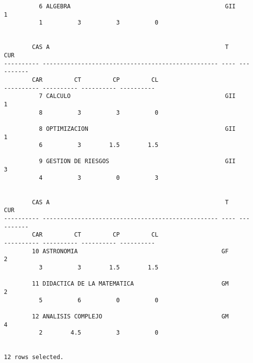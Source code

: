 \documentclass[11pt]{report}
\begin{document}
\begin{itemize}
\begin{verbatim}
          6 ALGEBRA                                            GII           1   
          1          3          3          0                                     
                                                                                

        CAS A                                                  T           CUR   
---------- -------------------------------------------------- ---- ----------   
        CAR         CT         CP         CL                                     
---------- ---------- ---------- ----------                                     
          7 CALCULO                                            GII           1   
          8          3          3          0                                     
                                                                                
          8 OPTIMIZACION                                       GII           1   
          6          3        1.5        1.5                                     
                                                                                
          9 GESTION DE RIESGOS                                 GII           3   
          4          3          0          3                                     
                                                                                

        CAS A                                                  T           CUR   
---------- -------------------------------------------------- ---- ----------   
        CAR         CT         CP         CL                                     
---------- ---------- ---------- ----------                                     
        10 ASTRONOMIA                                         GF            2   
          3          3        1.5        1.5                                     
                                                                                
        11 DIDACTICA DE LA MATEMATICA                         GM            2   
          5          6          0          0                                     
                                                                                
        12 ANALISIS COMPLEJO                                  GM            4   
          2        4.5          3          0                                     
                                                                                

12 rows selected.
  \end{verbatim}
\end{itemize}
\end{document}
